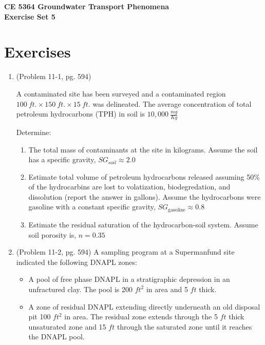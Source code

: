 \documentclass[12pt]{article}
\begin{document}
\begin{center}
{\textbf{{ CE 5364 Groundwater Transport Phenomena } \\ {Exercise Set 5}}}
\end{center}

\section*{\small{Exercises}}
\begin{enumerate} %


\item (Problem 11-1, pg. 594)

A contaminated site has been surveyed and a contaminated region $100~ft. \times 150~ft. \times 15~ft.$ was delineated. The average concentration of total petroleum hydrocarbons (TPH) in soil is $10,000~\frac{mg}{Kg}$

Determine:

\begin{enumerate} %
\item The total mass of contaminants at the site in kilograms. Assume the soil has a specific gravity, $SG _{soil} \approx 2.0$
\item Estimate total volume of petroleum hydrocarbons released assuming 50\% of the hydrocarbins are lost to volatization, biodegredation, and dissolution (report the answer in gallons). Assume the hydrocarbons were gasoline with a constant specific gravity, $SG_{\text{gasoline}} \approx 0.8$
\item Estimate the residual saturation of the hydrocarbon-soil system.  Assume soil porosity is, $n=0.35$
\end{enumerate} %



\clearpage

\item (Problem 11-2, pg. 594)
A sampling program at a Supermanfund site indicated the following DNAPL zones:
\begin{itemize}
\item A pool of free phase DNAPL in a stratigraphic depression in an unfractured clay. The pool is 200 $ft^2$ in area and 5 $ft$ thick.
\item A zone of residual DNAPL extending directly underneath an old disposal pit 100 $ft^2$ in area.  The residual zone extends through the 5 $ft$ thick unsaturated zone and 15 $ft$ through the saturated zone until it reaches the DNAPL pool.
\end{itemize}


\end{enumerate}
\end{document}

